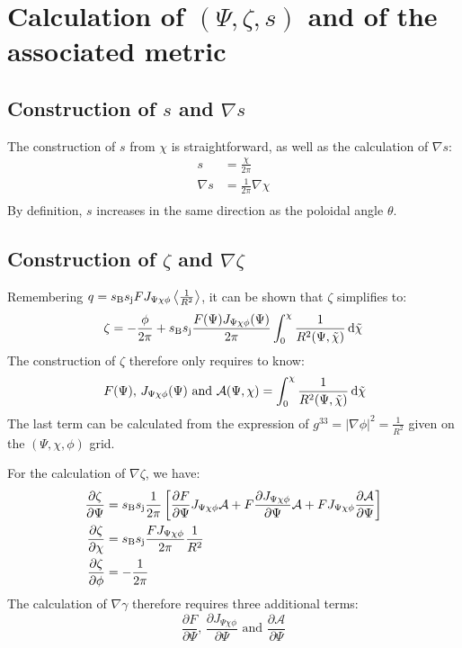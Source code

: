 \documentclass[a4paper,12pt]{article}
\newcommand{\ind}[1]{\ensuremath{_{\rm{#1}}}}
\begin{document}
\section{Calculation of $(\Psi,\zeta,s)$ and of the associated metric}
\subsection{Construction of $s$ and $\nabla s$}
The construction of $s$ from $\chi$ is straightforward, as well as the calculation of $\nabla s$:
\begin{align*}
s&=\frac{\chi}{2\pi}\\
\nabla s &= \frac{1}{2\pi}\nabla\chi\\
\end{align*}
By definition, $s$ increases in the same direction as the poloidal angle $\theta$.

\subsection{Construction of $\zeta$ and $\nabla \zeta$}
Remembering $q=s\ind{B}s\ind{j}FJ_{\Psi\chi\phi}\left<\frac{1}{R^2}\right>$, it can be shown that $\zeta$ simplifies to:
$$\zeta=-\frac{\phi}{2\pi}+s\ind{B}s\ind{j}\frac{F(\Psi)J_{\Psi\chi\phi}(\Psi)}{2\pi}\int_0^\chi \frac{1}{R^2(\Psi,\tilde{\chi})}\,{\rm d}\tilde{\chi}$$
The construction of $\zeta$ therefore only requires to know:
$$\,F(\Psi),\,J_{\Psi\chi\phi}(\Psi) \textrm{ and } \mathcal{A}(\Psi,\chi)=\int_0^\chi \frac{1}{R^2(\Psi,\tilde{\chi})}\,{\rm d}\tilde{\chi}$$
The last term can be calculated from the expression of $g^{33}=|\nabla\phi|^2=\frac{1}{R^2}$ given on the $(\Psi,\chi,\phi)$ grid.

For the calculation of $\nabla\zeta$, we have:
\begin{align*}
\frac{\partial\zeta}{\partial\Psi}&=s\ind{B}s\ind{j}\frac{1}{2\pi}\left[ \frac{\partial F}{\partial \Psi}J_{\Psi\chi\phi}\mathcal{A}  + F\frac{\partial J_{\Psi\chi\phi}}{\partial \Psi}\mathcal{A}
+FJ_{\Psi\chi\phi}\frac{\partial \mathcal{A}}{\partial\Psi}\right]\\ 
\frac{\partial\zeta}{\partial\chi}&=s\ind{B}s\ind{j}\frac{FJ_{\Psi\chi\phi}}{2\pi}\frac{1}{R^2}\\ 
\frac{\partial\zeta}{\partial\phi}&=-\frac{1}{2\pi}\\ 
\end{align*}
The calculation of $\nabla \gamma$ therefore requires three additional terms: 
$$\frac{\partial F}{\partial\Psi},\, \frac{\partial J_{\Psi\chi\phi}}{\partial\Psi} \textrm{ and } \frac{\partial \mathcal{A}}{\partial\Psi}$$
\end{document}
